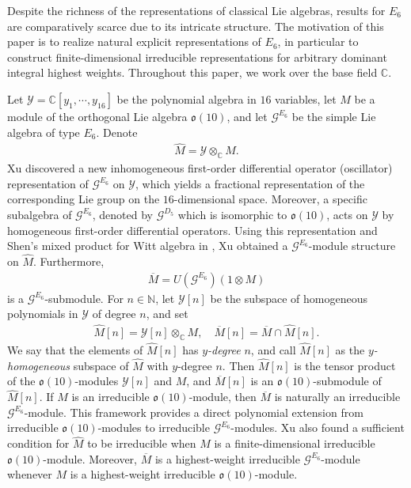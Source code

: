 \documentclass[12pt]{article}
\numberwithin{equation}{section}
\theoremstyle{definition}
\theoremstyle{remark}
\begin{document}
Despite the richness of the representations of classical Lie algebras, results for $E_6$ are comparatively scarce due to its intricate structure. The motivation of this paper is to realize natural explicit representations of $E_6$, in particular to construct finite-dimensional irreducible representations for arbitrary dominant integral highest weights. Throughout this paper, we work over the base field $\mathbb{C}$. 

Let $\mathscr{Y}=\mathbb{C}[y_1,\cdots,y_{16}]$ be the polynomial algebra in $16$ variables, let $M$ be a module of the orthogonal Lie algebra $\mathfrak{o}(10)$, and let $\mathscr{G}^{E_6}$ be the simple Lie algebra of type $E_6$. Denote
\begin{eqnarray}
	\widehat{M}=\mathscr{Y}\otimes_\mathbb{C} M.
\end{eqnarray}
Xu \cite{Xu} discovered a new inhomogeneous first-order differential operator (oscillator) representation of $\mathscr{G}^{E_6}$ on $\mathscr{Y}$, which yields a fractional representation of the corresponding Lie group on the $16$-dimensional space. Moreover, a specific subalgebra of $\mathscr{G}^{E_6}$, denoted by $\mathscr{G}^{D_5}$ which is isomorphic to $\mathfrak{o}(10)$, acts on $\mathscr{Y}$ by homogeneous first-order differential operators. Using this representation and Shen's mixed product for Witt algebra in \cite{Shen}, Xu obtained a $\mathscr{G}^{E_6}$-module structure on $\widehat{M}$. Furthermore,
\begin{eqnarray}
	\overline{M}=U(\mathscr{G}^{E_6})(1\otimes M)
\end{eqnarray}
is a $\mathscr{G}^{E_6}$-submodule. For $n\in\mathbb{N}$, let $\mathscr{Y}[n]$ be the subspace of homogeneous polynomials in $\mathscr{Y}$ of degree $n$, and set
\begin{eqnarray}
	\widehat{M}[n]=\mathscr{Y}[n]\otimes_{\mathbb{C}}M,\quad \overline{M}[n]=\overline{M}\cap\widehat{M}[n]. \label{1.3}
\end{eqnarray}
We say that the elements of $\widehat{M}[n]$ has {\it $y$-degree} $n$, and call $\widehat{M}[n]$ as the {\it $y$-homogeneous} subspace of $\widehat{M}$ with $y$-degree $n$.
Then $\widehat{M}[n]$ is the tensor product of the $\mathfrak{o}(10)$-modules $\mathscr{Y}[n]$ and $M$, and $\overline{M}[n]$ is an $\mathfrak{o}(10)$-submodule of $\widehat{M}[n]$. If $M$ is an irreducible $\mathfrak{o}(10)$-module, then $\overline{M}$ is naturally an irreducible $\mathscr{G}^{E_6}$-module. This framework provides a direct polynomial extension from irreducible $\mathfrak{o}(10)$-modules to irreducible $\mathscr{G}^{E_6}$-modules. Xu also found a sufficient condition for $\widehat{M}$ to be irreducible when $M$ is a finite-dimensional irreducible $\mathfrak{o}(10)$-module. Moreover, $\overline{M}$ is a highest-weight irreducible $\mathscr{G}^{E_6}$-module whenever $M$ is a highest-weight irreducible $\mathfrak{o}(10)$-module. 
\end{document}
